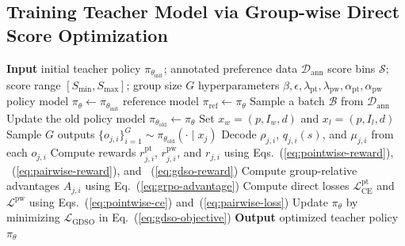 \documentclass{llmxive}
\providecommand{\teaname}{GDSO\xspace}
\begin{document}
\subsection{Training Teacher Model via Group-wise Direct Score Optimization}


\begin{algorithm}[t]
\caption{Iterative Group-wise Direct Score Optimization (\teaname)}
\label{alg:gdso}
\begin{algorithmic}[1]
  \Statex \textbf{Input} initial teacher policy $\pi_{\theta_{\mathrm{init}}}$; annotated preference data $\mathcal{D}_{\mathrm{ann}}$
  \Statex \hspace{\algorithmicindent} score bins $\mathcal{S}$; score range $[S_{\min},S_{\max}]$; group size $G$
  \Statex \hspace{\algorithmicindent} hyperparameters $\beta,\epsilon,\lambda_{\mathrm{pt}},\lambda_{\mathrm{pw}},\alpha_{\mathrm{pt}},\alpha_{\mathrm{pw}}$
  \State policy model $\pi_\theta \gets \pi_{\theta_{\mathrm{init}}}$
    \State reference model $\pi_{\mathrm{ref}} \gets \pi_\theta$
      \State Sample a batch $\mathcal{B}$ from $\mathcal{D}_{\mathrm{ann}}$
      \State Update the old policy model $\pi_{\theta_{\mathrm{old}}}\gets\pi_\theta$
        \State Set $x_w=(p,I_w,d)$ and $x_l=(p,I_l,d)$
          \State Sample $G$ outputs $\{o_{j,i}\}_{i=1}^{G}\sim\pi_{\theta_{\mathrm{old}}}(\cdot\mid x_j)$
          \State Decode $\rho_{j,i}$, $q_{j,i}(s)$, and $\mu_{j,i}$ from each $o_{j,i}$
        \EndFor
        \State Compute rewards $r^{\mathrm{pt}}_{j,i}$, $r^{\mathrm{pw}}_{j,i}$, and $r_{j,i}$ using Eqs.~(\ref{eq:pointwise-reward}), ~(\ref{eq:pairwise-reward}), and ~(\ref{eq:gdso-reward})
        \State Compute group-relative advantages $A_{j,i}$ using Eq.~(\ref{eq:grpo-advantage})
        \State Compute direct losses $\mathcal{L}^{\mathrm{pt}}_{\mathrm{CE}}$ and $\mathcal{L}^{\mathrm{pw}}$ using Eqs.~(\ref{eq:pointwise-ce}) and~(\ref{eq:pairwise-loss})
      \EndFor
        \State Update $\pi_\theta$ by minimizing $\mathcal{L}_{\mathrm{GDSO}}$ in Eq.~(\ref{eq:gdso-objective})
      \EndFor
    \EndFor
  \EndFor
  \Statex \textbf{Output} optimized teacher policy $\pi_\theta$
\end{algorithmic}
\end{algorithm}
\end{document}
